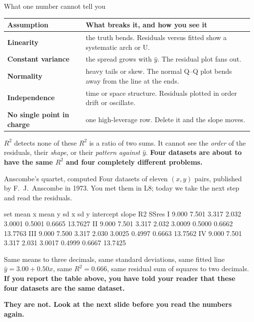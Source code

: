\documentclass[aspectratio=169]{beamer}
\begin{document}
\begin{frame}[shrink=6]{What one number cannot tell you}
  \begin{center}\small
  \begin{tabular}{@{}lp{7.6cm}@{}}
    \toprule
    \textbf{Assumption} & \textbf{What breaks it, and how you see it}\\
    \midrule
    \textbf{Linearity} & the truth bends. Residuals versus fitted show a
      systematic arch or U.\\[3pt]
    \textbf{Constant variance} & the spread grows with $\hat y$. The residual
      plot fans out.\\[3pt]
    \textbf{Normality} & heavy tails or skew. The normal Q--Q plot bends away
      from the line at the ends.\\[3pt]
    \textbf{Independence} & time or space structure. Residuals plotted in
      order drift or oscillate.\\[3pt]
    \textbf{No single point in charge} & one high-leverage row. Delete it and
      the slope moves.\\
    \bottomrule
  \end{tabular}
  \end{center}
  \vspace{0.3em}
  \begin{alertblock}{$R^2$ detects none of these}
    \small $R^2$ is a ratio of two sums. It cannot see the \emph{order} of the
    residuals, their \emph{shape}, or their \emph{pattern against $\hat y$}.
    \textbf{Four datasets are about to have the same $R^2$ and four completely
    different problems.}
  \end{alertblock}
\end{frame}

\begin{frame}[fragile,shrink=8]{Anscombe's quartet, computed}
Four datasets of eleven $(x,y)$ pairs, published by F.\ J.\ Anscombe in 1973.
You met them in L8; today we take the next step and read the residuals.
\begin{outblk}
set  mean x  mean y   sd x    sd y   intercept  slope    R2      SSres
I     9.000   7.501   3.317   2.032    3.0001  0.5001  0.6665  13.7627
II    9.000   7.501   3.317   2.032    3.0009  0.5000  0.6662  13.7763
III   9.000   7.500   3.317   2.030    3.0025  0.4997  0.6663  13.7562
IV    9.000   7.501   3.317   2.031    3.0017  0.4999  0.6667  13.7425
\end{outblk}
\begin{center}\small
  Same means to three decimals, same standard deviations, same fitted line
  $\hat y = 3.00 + 0.50x$, same $R^2 = 0.666$, same residual sum of squares to
  two decimals. \textbf{If you report the table above, you have told your
  reader that these four datasets are the same dataset.}
\end{center}
\begin{center}\small
  \textbf{They are not. Look at the next slide before you read the numbers
  again.}
\end{center}
\end{frame}
\end{document}

